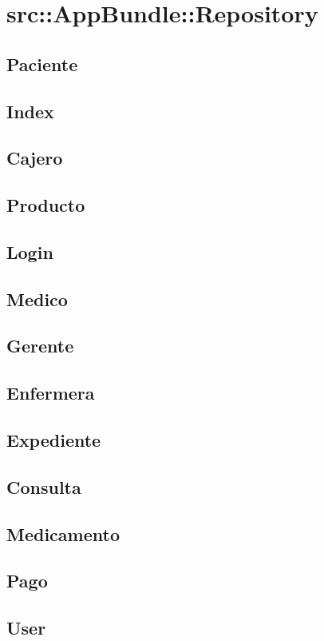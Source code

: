 \section{src::AppBundle::Repository}
	
	\subsection{Paciente}
		\subsection{Index}
		\subsection{Cajero}
		\subsection{Producto}
		\subsection{Login}
		\subsection{Medico}
		\subsection{Gerente}
		\subsection{Enfermera}
		\subsection{Expediente}
		\subsection{Consulta}
		\subsection{Medicamento}
		\subsection{Pago}
		\subsection{User}%


